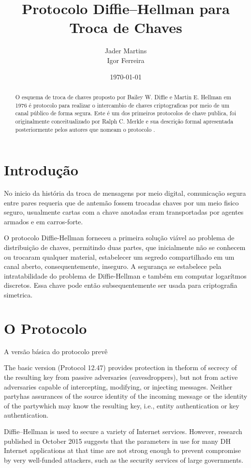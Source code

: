 \documentclass{article}
\title{Protocolo Diffie–Hellman para Troca de Chaves}
\author{Jader Martins\\
        Igor Ferreira}
\date{\today}
\begin{document}
\maketitle

\begin{abstract}
    O esquema de troca de chaves proposto por Bailey W. Diffie e
    Martin E. Hellman em 1976 é protocolo para realizar
    o intercambio de chaves criptograficas por meio de um canal público
    de forma segura\cite{Diffie}. Este é um dos primeiros protocolos de
    chave publica, foi originalmente conceitualizado por Ralph C. Merkle
    e sua descrição formal apresentada posteriormente pelos autores que
    nomeam o protocolo \cite{Merkle}.
\end{abstract}

\section{Introdução}%
\label{sec:introducao}
No inicio da história da troca de mensagens por meio digital, comunicação
segura entre pares requeria que de antemão fossem trocadas chaves por um
meio fisico seguro, usualmente cartas com a chave anotadas eram
transportadas por agentes armados e em carros-forte.

O protocolo Diffie-Hellman forneceu a primeira solução viável ao problema
de distribuição de chaves, permitindo duas partes, que inicialmente não se
conhecem ou trocaram qualquer material, estabelecer um segredo compartilhado
em um canal aberto, consequentemente, inseguro. A segurança se estabelece
pela intratabilidade do problema de Diffie-Hellman e também em computar
logarítmos discretos\cite{katz1996handbook}. Essa chave pode então
subsequentemente ser usada para criptografia simetrica.


\section{O Protocolo}%
\label{sec:o_protocolo}



A versão básica do protocolo prevê

The basic version (Protocol 12.47) provides protection in theform of secrecy of the resulting key from passive adversaries (eavesdroppers), but not from active adversaries capable of intercepting, modifying, or injecting messages. Neither partyhas assurances of the source identity of the incoming message or the identity of the partywhich may know the resulting key, i.e., entity authentication or key authentication.

Diffie–Hellman is used to secure a variety of Internet services. However, research published in October 2015 suggests that the parameters in use for many DH Internet applications at that time are not strong enough to prevent compromise by very well-funded attackers, such as the security services of large governments.





\end{document}
